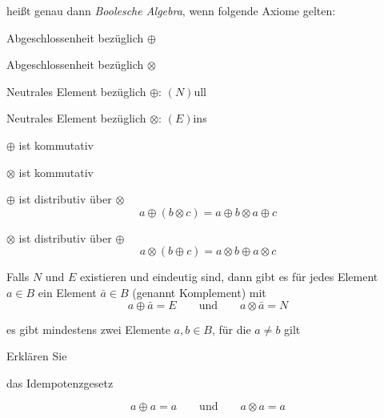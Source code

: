 \documentclass
[
  draft    = true,
  fontsize = 11pt,
  parskip  = half-,
  BCOR     = 0pt,
  DIV      = 11,
  ngerman,
  dvipsnames
]
{scrartcl}
\begin{document}
\begin{mytemize}
\begin{achim}
          heißt genau dann \emph{Boolesche Algebra}, wenn folgende Axiome gelten:
          \begin{mytemize}
            \item Abgeschlossenheit bezüglich $\oplus$
            \item Abgeschlossenheit bezüglich $\otimes$
            \item Neutrales Element bezüglich $\oplus$: $(N)$ull
            \item Neutrales Element bezüglich $\otimes$: $(E)$ins
            \item $\oplus$ ist kommutativ
            \item $\otimes$ ist kommutativ
            \item $\oplus$ ist distributiv über $\otimes$
                  \begin{equation*}
                    a\oplus(b\otimes c)=a\oplus b\otimes a\oplus c
                  \end{equation*}
            \item $\otimes$ ist distributiv über $\oplus$
                  \begin{equation*}
                    a\otimes(b\oplus c)=a\otimes b\oplus a\otimes c
                  \end{equation*}
            \item Falls $N$ und $E$ existieren und eindeutig sind,
                  dann gibt es für jedes Element $a\in B$ ein Element $\bar{a}\in B$
                  (genannt Komplement) mit
                  \begin{equation*}
                    a\oplus\bar{a}=E
                    \qquad\text{und}\qquad
                    a\otimes\bar{a}=N
                  \end{equation*}
            \item es gibt mindestens zwei Elemente $a,b\in B$, für die $a\neq b$ gilt
          \end{mytemize}
        \end{achim}
  \item Erklären Sie
        \begin{mytemize}
          \item das Idempotenzgesetz
            \begin{evelyn}
                \begin{equation*}
                    a\oplus a=a
                    \qquad\text{und}\qquad
                    a\otimes a=a
                \end{equation*}

\end{evelyn}
\end{mytemize}
\end{mytemize}
\end{document}
